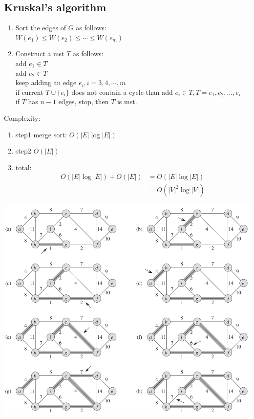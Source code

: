 \documentclass[a4paper]{article}
\begin{document}
\subsection*{Kruskal's algorithm}
\begin{enumerate}
    \item Sort the edges of $G$ as follows:\\
    $W(e_1)\leq W(e_2)\leq \cdots \leq W(e_m)$
    \item Construct a mst $T$ as follows:\\
    add $e_1\in T$\\
    add $e_2\in T$\\
    keep adding an edge $e_i, i=3,4,\cdots, m$\\
    \hspace*{1em}if current $T\cup \{e_i\}$ does not contain a cycle than add $e_i\in T, T={e_1,e_2,\ldots, e_i}$\\
    \hspace*{1em}if $T$ has $n-1$ edges, stop, then $T$ is mst.
\end{enumerate}
Complexity:
\begin{enumerate}
    \item step1 merge sort: $O(|E|\log{|E|})$
    \item step2 $O(|E|)$
    \item total:
        \begin{align*}
            O(|E|\log{|E|})+O(|E|)&=O(|E|\log{|E|})\\
            &=O(|V|^2\log{|V|})
        \end{align*}
\end{enumerate}
\includegraphics[width=\textwidth]{Kruskal1}
\end{document}
